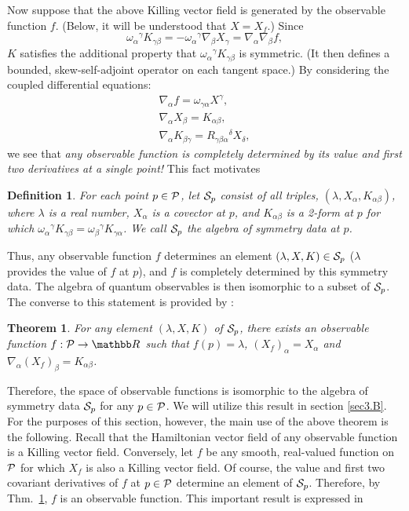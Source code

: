 \documentclass[12pt,aps,eqsecnum,tighten]{revtex4-2}
\newtheorem{theorem}{Theorem}[section]
\newtheorem{definition}{Definition}[section]
\def\be{\begin{equation}}
\def\ee{\end{equation}}
\def\ba{\begin{eqnarray}}
\def\ea{\end{eqnarray}}
\def\a{\alpha}
\def\b{\beta}
\def\c{\gamma}
\def\de{\delta}
\def\grad{\nabla}
\def\P{{\cal P}}
\def\w{\omega}
\newcommand{\hvf}[1]{{X_{#1}}}
\def\R{\mathbb R}
\begin{document}
Now suppose that the above Killing vector field is generated by the
observable function $f$. (Below, it will be understood that $X =
\hvf{f}$.) Since
%
\be
\w_\a{}^\c K_{\c\b} = - \w_\a{}^\c \grad_\b X_\c
		    = \grad_\a \grad_\b f,
\ee
%
$K$ satisfies the additional property that $\w_\a{}^\c K_{\c\b}$ is
symmetric.  (It then defines a bounded, skew-self-adjoint operator on
each tangent space.)  By considering the coupled differential
equations: 
%
\ba \grad_\a f = \w_{\c\a} X^\c, \\ \grad_\a X_\b =
K_{\a\b}, \\ \grad_\a K_{\b\c} = R_{\c\b\a}{}^\de X_\de, \ea 
%
we see \cite{thesis} that {\em any observable function is completely
determined by its value and first two derivatives at a single point!}
This fact motivates
%
\begin{definition}\label{Sp}
For each point $p\in\P$, let ${\cal S}_p$ consist of all triples,
$(\lambda, X_\a, K_{\a\b})$, where $\lambda$ is a real number, $X_\a$
is a covector at $p$, and $K_{\a\b}$ is a 2-form at $p$ for which
 $\w_\a{}^\c K_{\c\b} = \w_\b{}^\c K_{\c\a}$.  We call ${\cal S}_p$
the {\em algebra of symmetry data at $p$}.
\end{definition}
%
\noindent Thus, any observable function $f$ determines an element
$(\lambda, X, K) \in {\cal S}_p$ ($\lambda$ provides the value of $f$
at $p$), and $f$ is completely determined by this symmetry data.  The
algebra of quantum observables is then isomorphic to a subset of
${\cal S}_p$.  The converse to this statement is provided by
\cite{thesis}:
%
\begin{theorem}\label{thm_data}
For any element $(\lambda, X, K)$ of ${\cal S}_p$, there exists an
observable function $f : \P \rightarrow \R$ such that
$f(p) = \lambda$,  $(\hvf{f})_\a = X_\a$
and $\grad_\a (\hvf{f})_\b = K_{\a\b}$.
\end{theorem}
%
Therefore, the space of observable functions is isomorphic to the
algebra of symmetry data ${\cal S}_p$ for any $p\in\P$.  We will
utilize this result in section \ref{sec3.B}.  For the purposes of this
section, however, the main use of the above theorem is the following.
Recall that the Hamiltonian vector field of any observable function is
a Killing vector field.  Conversely, let $f$ be any smooth,
real-valued function on $\P$ for which $\hvf{f}$ is also a Killing
vector field.  Of course, the value and first two covariant
derivatives of $f$ at $p\in\P$ determine an element of ${\cal S}_p$.
Therefore, by Thm.~\ref{thm_data}, $f$ is an observable function.
This important result is expressed in
\end{document}
